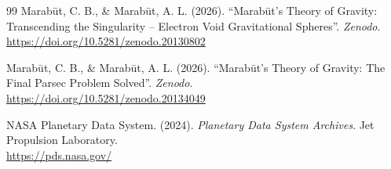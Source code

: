 \documentclass[11pt, a4paper]{article}
\begin{document}
\begin{thebibliography}{99}
  Marab\={u}t, C. B., \& Marab\={u}t, A. L. (2026). ``Marab\={u}t's Theory of Gravity: Transcending the Singularity -- Electron Void Gravitational Spheres''. \textit{Zenodo}. \\
  \url{https://doi.org/10.5281/zenodo.20130802}

  Marab\={u}t, C. B., \& Marab\={u}t, A. L. (2026). ``Marab\={u}t's Theory of Gravity: The Final Parsec Problem Solved''. \textit{Zenodo}. \\
  \url{https://doi.org/10.5281/zenodo.20134049}

  NASA Planetary Data System. (2024). \textit{Planetary Data System Archives}. Jet Propulsion Laboratory. \\
  \url{https://pds.nasa.gov/}

\end{thebibliography}
\end{document}
